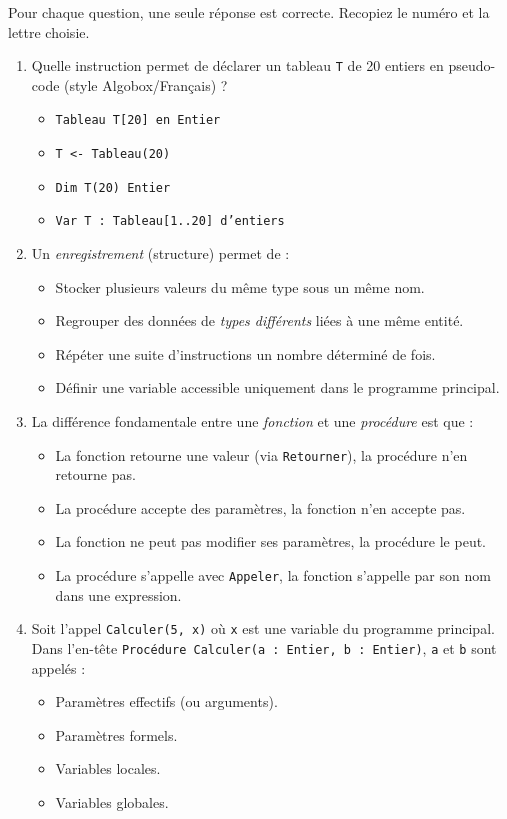 \documentclass[11pt]{article}
\begin{document}
\begin{exercice}
Pour chaque question, une seule réponse est correcte. Recopiez le numéro et la lettre choisie.
\begin{enumerate}
    \item Quelle instruction permet de déclarer un tableau \texttt{T} de 20 entiers en pseudo-code (style Algobox/Français) ?
    \begin{itemize}
        \item[A.] \texttt{Tableau T[20] en Entier}
        \item[B.] \texttt{T <- Tableau(20)}
        \item[C.] \texttt{Dim T(20) Entier}
        \item[D.] \texttt{Var T : Tableau[1..20] d'entiers}
    \end{itemize}
    \item Un \emph{enregistrement} (structure) permet de :
    \begin{itemize}
        \item[A.] Stocker plusieurs valeurs du même type sous un même nom.
        \item[B.] Regrouper des données de \emph{types différents} liées à une même entité.
        \item[C.] Répéter une suite d'instructions un nombre déterminé de fois.
        \item[D.] Définir une variable accessible uniquement dans le programme principal.
    \end{itemize}
    \item La différence fondamentale entre une \emph{fonction} et une \emph{procédure} est que :
    \begin{itemize}
        \item[A.] La fonction retourne une valeur (via \texttt{Retourner}), la procédure n'en retourne pas.
        \item[B.] La procédure accepte des paramètres, la fonction n'en accepte pas.
        \item[C.] La fonction ne peut pas modifier ses paramètres, la procédure le peut.
        \item[D.] La procédure s'appelle avec \texttt{Appeler}, la fonction s'appelle par son nom dans une expression.
    \end{itemize}
    \item Soit l'appel \texttt{Calculer(5, x)} où \texttt{x} est une variable du programme principal. Dans l'en-tête \texttt{Procédure Calculer(a : Entier, b : Entier)}, \texttt{a} et \texttt{b} sont appelés :
    \begin{itemize}
        \item[A.] Paramètres effectifs (ou arguments).
        \item[B.] Paramètres formels.
        \item[C.] Variables locales.
        \item[D.] Variables globales.
    \end{itemize}
\end{enumerate}
\end{exercice}
\end{document}
